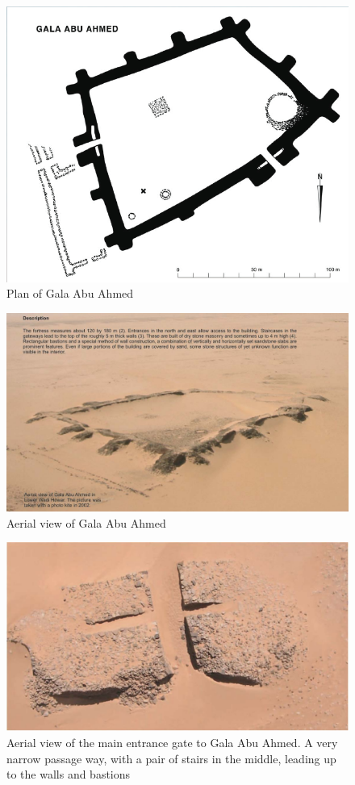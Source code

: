\documentclass[a4paper,12pt]{scrreprt}
\begin{document}
\begin{figure}[H]
	\centering
	\includegraphics[width=\textwidth]{img/fortress/gala_abu_ahmed}
	\caption{Plan of Gala Abu Ahmed}
\end{figure}

\begin{figure}[H]
	\centering
	\includegraphics[width=\textwidth]{img/fortress/aerial_view_gala_abu_ahmed}
	\caption{Aerial view of Gala Abu Ahmed}
\end{figure}

\begin{figure}[H]
	\centering
	\includegraphics[width=\textwidth]{img/fortress/aerial_view_entrance_bastion}
	\caption{Aerial view of the main entrance gate to Gala Abu Ahmed. A very narrow passage way, with a pair of stairs in the middle, leading up to the walls and bastions}
\end{figure}
\end{document}
